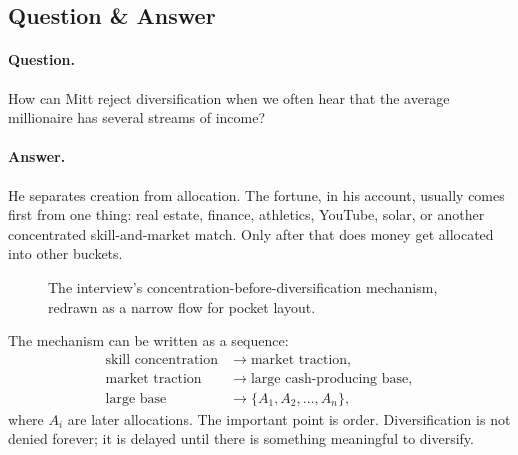 \subsection{Question \& Answer}

\paragraph{Question.}
How can Mitt reject diversification when we often hear that the average millionaire has several streams of income?

\paragraph{Answer.}
He separates creation from allocation. The fortune, in his account, usually comes first from one thing: real estate, finance, athletics, YouTube, solar, or another concentrated skill-and-market match. Only after that does money get allocated into other buckets.

\begin{figure}
\centering
{}
\caption{The interview's concentration-before-diversification mechanism, redrawn as a narrow flow for pocket layout.}
\end{figure}

The mechanism can be written as a sequence:
\begin{align}
\text{skill concentration} &\longrightarrow \text{market traction},\\
\text{market traction} &\longrightarrow \text{large cash-producing base},\\
\text{large base} &\longrightarrow \{A_1,A_2,\ldots,A_n\},
\end{align}
where \(A_i\) are later allocations. The important point is order. Diversification is not denied forever; it is delayed until there is something meaningful to diversify.

